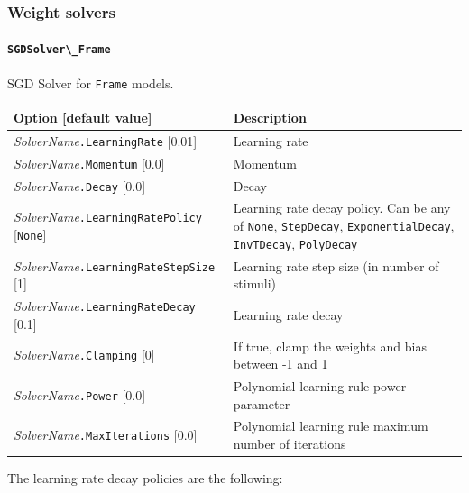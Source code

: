 \documentclass[a4paper,11pt,oneside]{article}
\begin{document}
\subsubsection{\label{sec:WeightSolvers}Weight solvers}

\paragraph{\texorpdfstring{%
\lstinline[basicstyle=\ttfamily\bfseries]!SGDSolver\_Frame!}{SGDSolver\_Frame}}
SGD Solver for \lstinline!Frame! models.

\begin{center}
 \begin{tabular}{| p{5cm} | p{10cm} | }
 \hline
 Option [default value] & Description\\
 \hline\hline
   \emph{SolverName}\lstinline!.LearningRate! [0.01] & Learning rate \\
   \emph{SolverName}\lstinline!.Momentum! [0.0] & Momentum \\
   \emph{SolverName}\lstinline!.Decay! [0.0] & Decay \\
   \emph{SolverName}\lstinline!.LearningRatePolicy! [\lstinline!None!]
   & Learning rate decay policy. Can be any of \lstinline!None!,
   \lstinline!StepDecay!, \lstinline!ExponentialDecay!, \lstinline!InvTDecay!,
    \lstinline!PolyDecay! \\
   \emph{SolverName}\lstinline!.LearningRateStepSize! [1] & Learning rate
    step size (in number of stimuli) \\
   \emph{SolverName}\lstinline!.LearningRateDecay! [0.1] & Learning rate
    decay \\
   \emph{SolverName}\lstinline!.Clamping! [0] & If true, clamp the weights and
   bias between -1 and 1 \\
   \emph{SolverName}\lstinline!.Power! [0.0] & Polynomial learning rule power
    parameter \\
   \emph{SolverName}\lstinline!.MaxIterations! [0.0] & Polynomial learning
   rule maximum number of iterations \\

 \hline
\end{tabular}
\end{center}

The learning rate decay policies are the following:
\end{document}
